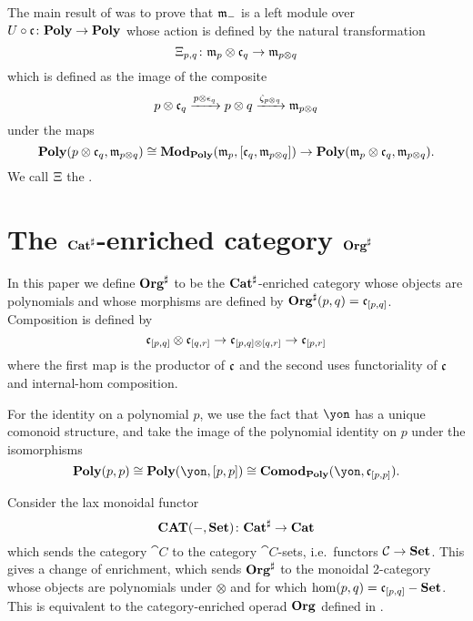 The main result of \cite[Theorem 3.4]{libkind2024pattern} was to prove that $\mathfrak{m}_-$ is a left module over $U \circ  \mathfrak{c} \colon \mathbf{Poly} \to \mathbf{Poly}$ whose action is defined by the natural transformation 
\[
    \Xi_{p,q}\colon \mathfrak{m}_p \otimes \mathfrak{c}_q \to \mathfrak{m}_{p \otimes q}
\] which is defined as the image of the composite
\[
    p \otimes \mathfrak{c}_q \xrightarrow{p \otimes \epsilon_q} p \otimes q \xrightarrow{\zeta_{p \otimes q}} \mathfrak{m}_{p \otimes q}
\] under the maps
\[
    \mathbf{Poly}(p \otimes \mathfrak{c}_q, \mathfrak{m}_{p\otimes q})  \cong \mathbf{Mod}_{\mathbf{Poly}}(\mathfrak{m}_p, [\mathfrak{c}_q, \mathfrak{m}_{p\otimes q}]) \to \mathbf{Poly}(\mathfrak{m}_p \otimes \mathfrak{c}_q, \mathfrak{m}_{p \otimes q}).
\] We call $\Xi$ the .



\section{The $\mathbf{Cat}^\sharp$-enriched category $\mathbf{Org}^\sharp$}\label{sec.orgsharp}

In this paper we define $\mathbf{Org}^\sharp$ to be the $\mathbf{Cat}^\sharp$-enriched category whose objects are polynomials and whose morphisms are defined by $\mathbf{Org}^\sharp(p, q) = \mathfrak{c}_{[p,q]}$. 
Composition is defined by 
\[
    \mathfrak{c}_{[p,q]} \otimes \mathfrak{c}_{[q,r]} \to \mathfrak{c}_{[p, q] \otimes [q, r]} \to \mathfrak{c}_{[p, r]}
\]
where the first map is the productor of $\mathfrak{c}$ and the second uses functoriality of $\mathfrak{c}$ and internal-hom composition.

For the identity on a polynomial $p$, we use the fact that $\yon$ has a unique comonoid structure, and take the image of the polynomial identity on $p$ under the isomorphisms
\[
    \poly(p, p) \iso \poly(\yon , [p, p]) \iso \comodpoly(\yon, \cofree_{[p,p]}).
\]

Consider the lax monoidal functor
\[\mathbf{CAT}(-,\mathbf{Set}) \colon \mathbf{Cat}^\sharp \to \mathbf{Cat}\]
which sends the category $\cat{C}$ to the category $\cat{C}$-sets, i.e.\ functors $\mathcal{C}\to\mathbf{Set}$. This gives a change of enrichment, which sends $\mathbf{Org}^\sharp$ to the monoidal 2-category whose objects are polynomials under $\otimes$ and for which $\hom(p,q)=\mathfrak{c}_{[p,q]}-\mathbf{Set}$. This is equivalent to the category-enriched operad $\mathbf{Org}$ defined in \cite[Definition 2.19]{spivak2021learnersv1}.

